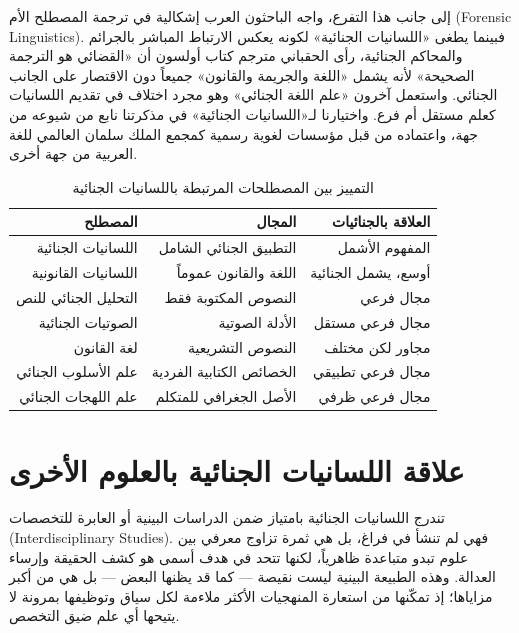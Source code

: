 إلى جانب هذا التفرع، واجه الباحثون العرب إشكالية في ترجمة المصطلح الأم (\textenglish{Forensic Linguistics}). فبينما يطغى «اللسانيات الجنائية» لكونه يعكس الارتباط المباشر بالجرائم والمحاكم الجنائية، رأى الحقباني مترجم كتاب أولسون أن «القضائي هو الترجمة الصحيحة» لأنه يشمل «اللغة والجريمة والقانون» جميعاً دون الاقتصار على الجانب الجنائي\autocite[1]{alhaqbani2008}. واستعمل آخرون «علم اللغة الجنائي» وهو مجرد اختلاف في تقديم اللسانيات كعلم مستقل أم فرع. واختيارنا لـ«اللسانيات الجنائية» في مذكرتنا نابع من شيوعه من جهة، واعتماده من قبل مؤسسات لغوية رسمية كمجمع الملك سلمان العالمي للغة العربية من جهة أخرى.\autocite[7]{doha2023}

\begin{table}[H]
\centering
\caption{التمييز بين المصطلحات المرتبطة باللسانيات الجنائية}
\begin{tabular}{r r r}
\toprule
\textbf{المصطلح} & \textbf{المجال} & \textbf{العلاقة بالجنائيات} \\
\midrule
اللسانيات الجنائية & التطبيق الجنائي الشامل & المفهوم الأشمل \\
اللسانيات القانونية & اللغة والقانون عموماً & أوسع، يشمل الجنائية \\
التحليل الجنائي للنص & النصوص المكتوبة فقط & مجال فرعي \\
الصوتيات الجنائية & الأدلة الصوتية & مجال فرعي مستقل \\
لغة القانون & النصوص التشريعية & مجاور لكن مختلف \\
علم الأسلوب الجنائي & الخصائص الكتابية الفردية & مجال فرعي تطبيقي \\
علم اللهجات الجنائي & الأصل الجغرافي للمتكلم & مجال فرعي ظرفي \\
\bottomrule
\end{tabular}
\end{table}



\section{علاقة اللسانيات الجنائية بالعلوم الأخرى}

تندرج اللسانيات الجنائية بامتياز ضمن الدراسات البينية أو العابرة للتخصصات (\textenglish{Interdisciplinary Studies}). فهي لم تنشأ في فراغ، بل هي ثمرة تزاوج معرفي بين علوم تبدو متباعدة ظاهرياً، لكنها تتحد في هدف أسمى هو كشف الحقيقة وإرساء العدالة. وهذه الطبيعة البينية ليست نقيصة — كما قد يظنها البعض — بل هي من أكبر مزاياها؛ إذ تمكّنها من استعارة المنهجيات الأكثر ملاءمة لكل سياق وتوظيفها بمرونة لا يتيحها أي علم ضيق التخصص.\autocite[4]{cerist2023}

